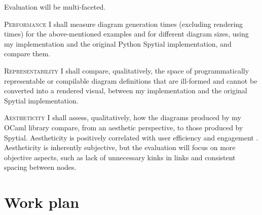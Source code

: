 \documentclass[a4paper, 12pt]{article}
\begin{document}
Evaluation will be multi-faceted.

\textsc{Performance} \hspace{1em} I shall measure diagram generation times (excluding rendering times) for the above-mentioned examples and for different diagram sizes, using my implementation and the original Python Spytial implementation, and compare them.

\textsc{Representability} \hspace{1em} I shall compare, qualitatively, the space of programmatically representable or compilable diagram definitions that are ill-formed and cannot be converted into a rendered visual, between my implementation and the original Spytial implementation.

\textsc{Aestheticity} \hspace{1em} I shall assess, qualitatively, how the diagrams produced by my OCaml library compare, from an aesthetic perspective, to those produced by Spytial. Aestheticity is positively correlated with user efficiency and engagement \cite{aestheticity}. Aestheticity is inherently subjective, but the evaluation will focus on more objective aspects, such as lack of unnecessary kinks in links and consistent spacing between nodes.

\section{Work plan}
\end{document}
